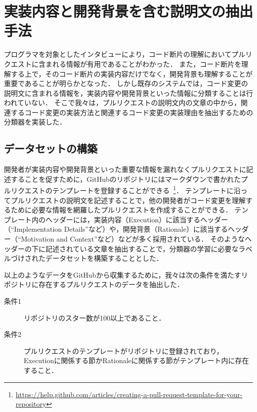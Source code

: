 \section{実装内容と開発背景を含む説明文の抽出手法}


プログラマを対象としたインタビューにより，コード断片の理解においてプルリクエストに含まれる情報が有用であることがわかった．
また，コード断片を理解する上で，そのコード断片の実装内容だけでなく，開発背景も理解することが重要であることが明らかとなった．
しかし既存のシステムでは，コード変更の説明文に含まれる情報を，実装内容や開発背景といった情報に分類することは行われていない．
そこで我々は，プルリクエストの説明文内の文章の中から，関連するコード変更の実装方法と関連するコード変更の実装理由を抽出するための分類器を実装した．


\subsection{データセットの構築}


開発者が実装内容や開発背景といった重要な情報を漏れなくプルリクエストに記述することを促すために，GitHubのリポジトリにはマークダウンで書かれたプルリクエストのテンプレートを登録することができる~\footnote{\url{https://help.github.com/articles/creating-a-pull-request-template-for-your-repository}}．
テンプレートに沿ってプルリクエストの説明文を記述することで，他の開発者がコード変更を理解するために必要な情報を網羅したプルリクエストを作成することができる．
テンプレート内のヘッダーには，実装内容（Execution）に該当するヘッダー（``Implementation Details''など）や，開発背景（Rationale）に該当するヘッダー（``Motivation and Context''など）などが多く採用されている．
そのようなヘッダーの下に記述されている文章を抽出することで，分類器の学習に必要なラベルづけされたデータセットを構築することとした．

以上のようなデータをGitHubから収集するために，我々は次の条件を満たすリポジトリに存在するプルリクエストのデータを抽出した．

\begin{description}
\item[条件1] リポジトリのスター数が100以上であること．
\item[条件2] プルリクエストのテンプレートがリポジトリに登録されており， Executionに関係する節かRationaleに関係する節がテンプレート内に存在すること．
\end{description}

